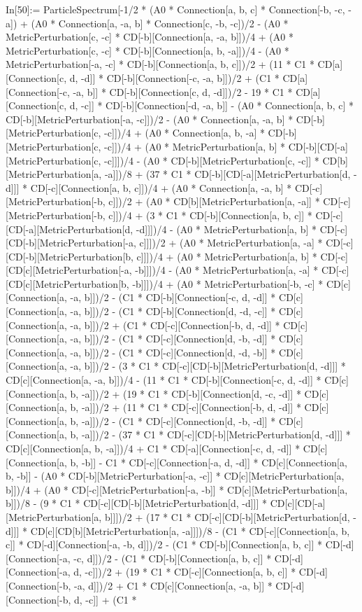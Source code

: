 In[50]:= ParticleSpectrum[-1/2 * (A0 * Connection[a, b, c] * Connection[-b, -c, -a]) + (A0 * Connection[a, -a, b] * Connection[c, -b, -c])/2 - (A0 * MetricPerturbation[c, -c] * CD[-b][Connection[a, -a, b]])/4 + (A0 * MetricPerturbation[c, -c] * CD[-b][Connection[a, b, -a]])/4 - (A0 * MetricPerturbation[-a, -c] * CD[-b][Connection[a, b, c]])/2 + (11 * C1 * CD[a][Connection[c, d, -d]] * CD[-b][Connection[-c, -a, b]])/2 + (C1 * CD[a][Connection[-c, -a, b]] * CD[-b][Connection[c, d, -d]])/2 - 19 * C1 * CD[a][Connection[c, d, -c]] * CD[-b][Connection[-d, -a, b]] - (A0 * Connection[a, b, c] * CD[-b][MetricPerturbation[-a, -c]])/2 - (A0 * Connection[a, -a, b] * CD[-b][MetricPerturbation[c, -c]])/4 + (A0 * Connection[a, b, -a] * CD[-b][MetricPerturbation[c, -c]])/4 + (A0 * MetricPerturbation[a, b] * CD[-b][CD[-a][MetricPerturbation[c, -c]]])/4 - (A0 * CD[-b][MetricPerturbation[c, -c]] * CD[b][MetricPerturbation[a, -a]])/8 + (37 * C1 * CD[-b][CD[-a][MetricPerturbation[d, -d]]] * CD[-c][Connection[a, b, c]])/4 + (A0 * Connection[a, -a, b] * CD[-c][MetricPerturbation[-b, c]])/2 + (A0 * CD[b][MetricPerturbation[a, -a]] * CD[-c][MetricPerturbation[-b, c]])/4 + (3 * C1 * CD[-b][Connection[a, b, c]] * CD[-c][CD[-a][MetricPerturbation[d, -d]]])/4 - (A0 * MetricPerturbation[a, b] * CD[-c][CD[-b][MetricPerturbation[-a, c]]])/2 + (A0 * MetricPerturbation[a, -a] * CD[-c][CD[-b][MetricPerturbation[b, c]]])/4 + (A0 * MetricPerturbation[a, b] * CD[-c][CD[c][MetricPerturbation[-a, -b]]])/4 - (A0 * MetricPerturbation[a, -a] * CD[-c][CD[c][MetricPerturbation[b, -b]]])/4 + (A0 * MetricPerturbation[-b, -c] * CD[c][Connection[a, -a, b]])/2 - (C1 * CD[-b][Connection[-c, d, -d]] * CD[c][Connection[a, -a, b]])/2 - (C1 * CD[-b][Connection[d, -d, -c]] * CD[c][Connection[a, -a, b]])/2 + (C1 * CD[-c][Connection[-b, d, -d]] * CD[c][Connection[a, -a, b]])/2 - (C1 * CD[-c][Connection[d, -b, -d]] * CD[c][Connection[a, -a, b]])/2 - (C1 * CD[-c][Connection[d, -d, -b]] * CD[c][Connection[a, -a, b]])/2 - (3 * C1 * CD[-c][CD[-b][MetricPerturbation[d, -d]]] * CD[c][Connection[a, -a, b]])/4 - (11 * C1 * CD[-b][Connection[-c, d, -d]] * CD[c][Connection[a, b, -a]])/2 + (19 * C1 * CD[-b][Connection[d, -c, -d]] * CD[c][Connection[a, b, -a]])/2 + (11 * C1 * CD[-c][Connection[-b, d, -d]] * CD[c][Connection[a, b, -a]])/2 - (C1 * CD[-c][Connection[d, -b, -d]] * CD[c][Connection[a, b, -a]])/2 - (37 * C1 * CD[-c][CD[-b][MetricPerturbation[d, -d]]] * CD[c][Connection[a, b, -a]])/4 + C1 * CD[-a][Connection[-c, d, -d]] * CD[c][Connection[a, b, -b]] - C1 * CD[-c][Connection[-a, d, -d]] * CD[c][Connection[a, b, -b]] - (A0 * CD[-b][MetricPerturbation[-a, -c]] * CD[c][MetricPerturbation[a, b]])/4 + (A0 * CD[-c][MetricPerturbation[-a, -b]] * CD[c][MetricPerturbation[a, b]])/8 - (9 * C1 * CD[-c][CD[-b][MetricPerturbation[d, -d]]] * CD[c][CD[-a][MetricPerturbation[a, b]]])/2 + (17 * C1 * CD[-c][CD[-b][MetricPerturbation[d, -d]]] * CD[c][CD[b][MetricPerturbation[a, -a]]])/8 - (C1 * CD[-c][Connection[a, b, c]] * CD[-d][Connection[-a, -b, d]])/2 - (C1 * CD[-b][Connection[a, b, c]] * CD[-d][Connection[-a, -c, d]])/2 - (C1 * CD[-b][Connection[a, b, c]] * CD[-d][Connection[-a, d, -c]])/2 + (19 * C1 * CD[-c][Connection[a, b, c]] * CD[-d][Connection[-b, -a, d]])/2 + C1 * CD[c][Connection[a, -a, b]] * CD[-d][Connection[-b, d, -c]] + (C1 * 